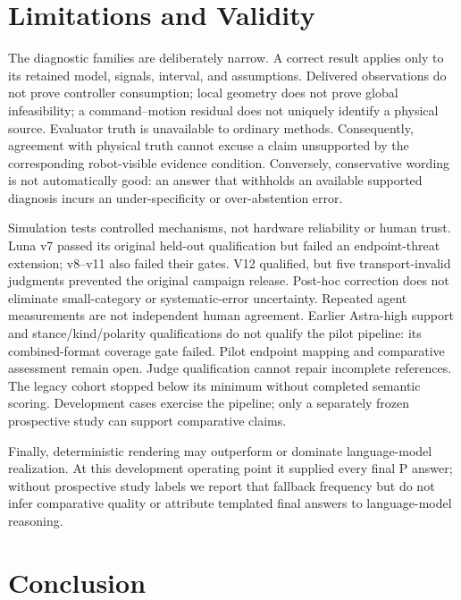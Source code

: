 \documentclass[conference]{IEEEtran}
\begin{document}
\section{Limitations and Validity}

The diagnostic families are deliberately narrow. A correct result applies only to its retained
model, signals, interval, and assumptions. Delivered observations do not prove controller
consumption; local geometry does not prove global infeasibility; a command--motion residual does
not uniquely identify a physical source. Evaluator truth is unavailable to ordinary methods.
Consequently, agreement with physical truth cannot excuse a claim unsupported by the corresponding
robot-visible evidence condition. Conversely, conservative wording is not automatically good: an
answer that withholds an available supported diagnosis incurs an under-specificity or
over-abstention error.

Simulation tests controlled mechanisms, not hardware reliability or human trust. Luna v7 passed
its original held-out qualification but failed an endpoint-threat extension; v8--v11 also failed
their gates. V12 qualified, but five transport-invalid judgments prevented the original campaign
release. Post-hoc correction does not eliminate small-category or systematic-error uncertainty.
Repeated agent measurements are not independent human agreement. Earlier Astra-high support and
stance/kind/polarity qualifications do not qualify the pilot pipeline: its combined-format coverage
gate failed. Pilot endpoint mapping and comparative assessment remain open.
Judge qualification cannot repair incomplete references. The legacy cohort stopped below its
minimum without completed semantic scoring. Development cases exercise the pipeline; only a
separately frozen prospective study can support comparative claims.

Finally, deterministic rendering may outperform or dominate language-model realization. At this
development operating point it supplied every final P answer; without prospective study labels we
report that fallback frequency but do not infer comparative quality or attribute templated final
answers to language-model reasoning.

\section{Conclusion}
\end{document}
